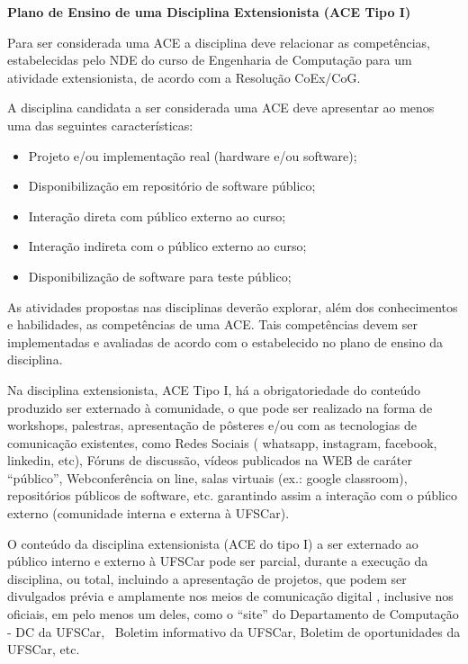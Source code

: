 \bigskip

\textbf{Plano de Ensino de uma Disciplina Extensionista (ACE Tipo I)}


\bigskip

Para ser considerada uma ACE a disciplina deve relacionar as competências, estabelecidas pelo NDE do curso de Engenharia
de Computação para um atividade extensionista, de acordo com a Resolução CoEx/CoG. 

A disciplina candidata a ser considerada uma ACE deve apresentar ao menos uma das seguintes características: 

\begin{itemize}[series=listWWNumi,label=\textstyleListLabeli{${\bullet}$}]
\item Projeto e/ou implementação real (hardware e/ou software);
\item Disponibilização em repositório de software público;
\item Interação direta com público externo ao curso;
\item Interação indireta com o público externo ao curso;
\item Disponibilização de software para teste público;
\end{itemize}
\bigskip

As atividades propostas nas disciplinas deverão explorar, além dos conhecimentos e habilidades, as competências de uma
ACE. Tais competências devem ser implementadas e avaliadas de acordo com o estabelecido no plano de ensino da
disciplina.


\bigskip

Na disciplina extensionista, ACE Tipo I, há a obrigatoriedade do conteúdo produzido ser externado à comunidade, o que
pode ser realizado na forma de workshops, palestras, apresentação de pôsteres e/ou com as tecnologias de comunicação
existentes, como Redes Sociais (%
whatsapp, instagram, facebook, linkedin, etc), Fóruns de discussão, vídeos publicados na WEB de caráter “público”,
Webconferência on line, salas virtuais (ex.: google classroom), repositórios públicos de software, etc. garantindo
assim a interação com o público externo (comunidade interna e externa à UFSCar).


\bigskip

O conteúdo da disciplina extensionista (ACE do tipo I) a ser externado ao público interno e externo à UFSCar pode ser
parcial, durante a execução da disciplina, ou total, incluindo a apresentação de projetos, que podem ser divulgados
prévia e amplamente nos meios de comunicação digital%
, inclusive nos oficiais, em pelo menos um deles, como o “site” do Departamento de Computação - DC da UFSCar, \ Boletim
informativo da UFSCar, Boletim de oportunidades da UFSCar, etc.

%